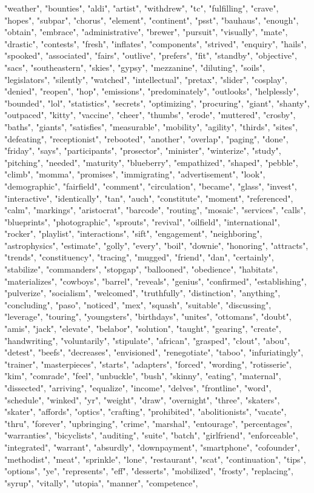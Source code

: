 "weather", "bounties", "aldi", "artist", "withdrew", "tc", "fulfilling", "crave", "hopes", "subpar", "chorus", "element", "continent", "psst", "bauhaus", "enough", "obtain", "embrace", "administrative", "brewer", "pursuit", "visually", "mate", "drastic", "contests", "fresh", "inflates", "components", "strived", "enquiry", "hails", "spooked", "associated", "fairs", "outlive", "prefers", "fit", "standby", "objective", "sacs", "southeastern", "skies", "gypsy", "mezzanine", "diluting", "soils", "legislators", "silently", "watched", "intellectual", "pretax", "slider", "cosplay", "denied", "reopen", "hop", "emissions", "predominately", "outlooks", "helplessly", "bounded", "lol", "statistics", "secrets", "optimizing", "procuring", "giant", "shanty", "outpaced", "kitty", "vaccine", "cheer", "thumbs", "erode", "muttered", "crosby", "baths", "giants", "satisfies", "measurable", "mobility", "agility", "thirds", "sites", "defeating", "receptionist", "rebooted", "another", "overlap", "paging", "done", "friday", "says", "participants", "prosector", "minister", "winterize", "study", "pitching", "needed", "maturity", "blueberry", "empathized", "shaped", "pebble", "climb", "momma", "promises", "immigrating", "advertisement", "look", "demographic", "fairfield", "comment", "circulation", "became", "glass", "invest", "interactive", "identically", "tan", "auch", "constitute", "moment", "referenced", "calm", "markings", "aristocrat", "barcode", "routing", "mosaic", "services", "calls", "blueprints", "photographic", "sprouts", "revival", "oilfield", "international", "rocker", "playlist", "interactions", "sift", "engagement", "neighboring", "astrophysics", "estimate", "golly", "every", "boil", "downie", "honoring", "attracts", "trends", "constituency", "tracing", "mugged", "friend", "dan", "certainly", "stabilize", "commanders", "stopgap", "ballooned", "obedience", "habitats", "materializes", "cowboys", "barrel", "reveals", "genius", "confirmed", "establishing", "pulverize", "socialism", "welcomed", "truthfully", "distinction", "anything", "concluding", "paso", "noticed", "mex", "squash", "suitable", "discussing", "leverage", "touring", "youngsters", "birthdays", "unites", "ottomans", "doubt", "amis", "jack", "elevate", "belabor", "solution", "taught", "gearing", "create", "handwriting", "voluntarily", "stipulate", "african", "grasped", "clout", "abou", "detest", "beefs", "decreases", "envisioned", "renegotiate", "taboo", "infuriatingly", "trainer", "masterpieces", "starts", "adapters", "forced", "wording", "rotisserie", "kim", "comrade", "feel", "unbuckle", "bush", "skinny", "eating", "maternal", "dissected", "arriving", "equalize", "income", "delves", "frontline", "word", "schedule", "winked", "yr", "weight", "draw", "overnight", "three", "skaters", "skater", "affords", "optics", "crafting", "prohibited", "abolitionists", "vacate", "thru", "forever", "upbringing", "crime", "marshal", "entourage", "percentages", "warranties", "bicyclists", "auditing", "suite", "batch", "girlfriend", "enforceable", "integrated", "warrant", "absurdly", "downpayment", "smartphone", "cofounder", "methodist", "meat", "sprinkle", "lone", "restaurant", "scat", "continuation", "tips", "options", "ye", "represents", "eff", "desserts", "mobilized", "frosty", "replacing", "syrup", "vitally", "utopia", "manner", "competence", 
